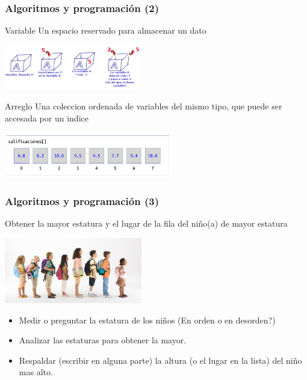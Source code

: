 \begin{frame}[fragile]
\frametitle{Algoritmos y programaci\'on (2)}

\begin{block}{Variable}
Un espacio reservado para almacenar un dato \pause
\end{block}

\begin{center}
\includegraphics[width=0.45\textwidth]{Figs/que_es_una_variable.png} \pause
\end{center} 

\begin{block}{Arreglo}
Una coleccion ordenada de variables del mismo tipo, que puede ser accesada por un indice\pause
\end{block}

\begin{center}
\includegraphics[width=0.55\textwidth]{Figs/arreglos1.png}
\end{center} 


\end{frame}


\begin{frame}[fragile]
\frametitle{Algoritmos y programaci\'on (3)}

\begin{block}{Obtener la mayor estatura y el lugar de la fila del niño(a) de mayor estatura}
\begin{center}
\includegraphics[width=0.45\textwidth]{Figs/fila_ninos.jpg} \pause
\end{center}  
\end{block}

\begin{itemize}
\item Medir o preguntar la estatura de los niños (En orden o en desorden?) \pause
\item Analizar las estaturas para obtener la mayor. \pause
\item Respaldar (escribir en alguna parte) la altura (o el lugar en la lista) del niño mas alto.  \pause
\end{itemize}

\end{frame}





